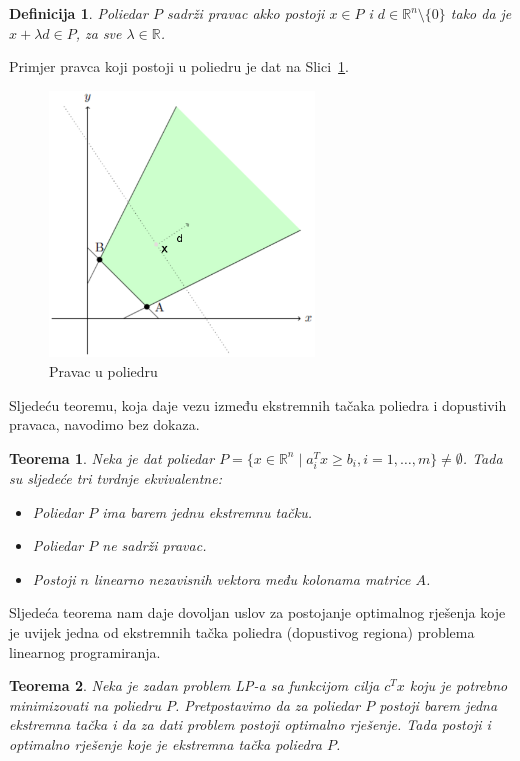 \documentclass[b5paper, utf8, 11pt, colorlinks]{book}
\newtheorem{definition}{Definicija}[chapter]
\newtheorem{thm}{Teorema}[chapter]
\theoremstyle{definition}
\begin{document}
 \begin{definition}
       Poliedar $P$ sadrži pravac akko postoji $x \in P$ i $d \in \mathbb{R}^n \setminus \{0\}$ tako da je $x + \lambda d \in P$, za sve $\lambda \in \mathbb{R}$. 
 \end{definition}
Primjer pravca koji postoji u poliedru je dat na Slici~\ref{fig:extreme-ray}. 
  \begin{figure}[!htb]
	\centering
	\includegraphics[width=200pt,height=200pt]{extremerays.eps}
	\caption{Pravac u poliedru}
		\label{fig:extreme-ray}
   \end{figure}  

Sljedeću teoremu, koja daje vezu između ekstremnih tačaka poliedra i dopustivih pravaca, navodimo bez dokaza.

\begin{thm}\label{thm:pravac}
   Neka je dat poliedar $P=\{ x \in \mathbb{R}^n  \mid a_i^T x \geq b_i, i=1,\ldots,m\} \neq \emptyset$. Tada su sljedeće tri tvrdnje ekvivalentne:
   \begin{itemize}
       \item  Poliedar $P$ ima barem jednu ekstremnu tačku.
       \item Poliedar $P$ ne sadrži pravac.
       \item Postoji $n$ linearno nezavisnih vektora  među kolonama matrice $A$. %
   \end{itemize}
\end{thm}

Sljedeća teorema nam daje dovoljan uslov za postojanje optimalnog rješenja koje je uvijek jedna od ekstremnih tačka poliedra (dopustivog regiona) problema linearnog programiranja.

\begin{thm}
   Neka je zadan problem LP-a sa funkcijom cilja $c^Tx$ koju je potrebno minimizovati na poliedru $P$. Pretpostavimo da za poliedar $P$ postoji barem jedna ekstremna tačka i da za dati problem postoji optimalno rješenje. Tada postoji i optimalno rješenje koje je ekstremna tačka poliedra $P$.
\end{thm}
\end{document}
